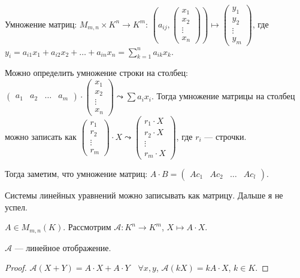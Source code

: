  \begin{definition}
     Умножение матриц: $M_{m, n} \times K^n \to K^m$: $(a_{ij}, \begin{pmatrix} x_1 \\ x_2 \\ \vdots \\ x_n \end{pmatrix}) \mapsto \begin{pmatrix} y_1 \\ y_2 \\ \vdots \\ y_m \end{pmatrix}$, где $y_i = a_{i 1} x_1 + a_{i 2}x_2 + \ldots + a_{in}x_n = \sum\limits_{k=1}^n a_{ik}x_k$.

     Можно определить умножение строки на столбец:  $\begin{pmatrix} a_1 & a_2 & \ldots & a_m \end{pmatrix} \cdot \begin{pmatrix} x_1 \\ x_2 \\ \vdots \\ x_n\end{pmatrix} \leadsto \sum a_i x_i$.  Тогда умножение матрицы на столбец можно записать как $\begin{pmatrix} r_1 \\ r_2 \\ \vdots \\ r_m \end{pmatrix} \cdot X \leadsto \begin{pmatrix} r_1 \cdot X \\ r_2 \cdot X \\ \vdots \\ r_m \cdot X \end{pmatrix}$, где $r_i$ --- строчки.

     Тогда заметим, что умножение матриц: $A \cdot B = \begin{pmatrix} Ac_1 & Ac_2 & \ldots  & Ac_l \end{pmatrix}$.
\end{definition}
\begin{example}[.СЛУ]
    Системы линейных уравнений можно записывать как матрицу. Дальше я не успел. 
\end{example}
\begin{remark}
    $A \in M_{m, n}(K)$. Рассмотрим  $\mathcal{A}\!: K^n \to K^m$,  $X \mapsto A \cdot X$.
\end{remark}
\begin{statement}
    $\mathcal{A}$ --- линейное отображение. 
\end{statement}
\begin{proof}
    $\mathcal{A}(X+Y) = A \cdot X + A \cdot Y\quad \forall x, y$,  $\mathcal{A}(kX) = kA\cdot X$,  $k \in K$.
\end{proof}

